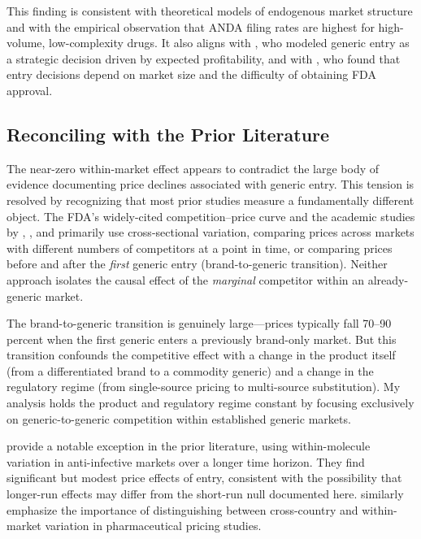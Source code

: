 \documentclass[12pt]{article}
\begin{document}
This finding is consistent with theoretical models of endogenous market structure \citep{Berry1992, Bresnahan1991, Sutton1991} and with the empirical observation that ANDA filing rates are highest for high-volume, low-complexity drugs. It also aligns with \citet{Reiffen2004}, who modeled generic entry as a strategic decision driven by expected profitability, and with \citet{Scott2005}, who found that entry decisions depend on market size and the difficulty of obtaining FDA approval.

\subsection{Reconciling with the Prior Literature}

The near-zero within-market effect appears to contradict the large body of evidence documenting price declines associated with generic entry. This tension is resolved by recognizing that most prior studies measure a fundamentally different object. The FDA's widely-cited competition--price curve \citep{FDA2019} and the academic studies by \citet{Caves1991}, \citet{Reiffen2002}, and \citet{Grabowski2007} primarily use cross-sectional variation, comparing prices across markets with different numbers of competitors at a point in time, or comparing prices before and after the \emph{first} generic entry (brand-to-generic transition). Neither approach isolates the causal effect of the \emph{marginal} competitor within an already-generic market.

The brand-to-generic transition is genuinely large---prices typically fall 70--90 percent when the first generic enters a previously brand-only market. But this transition confounds the competitive effect with a change in the product itself (from a differentiated brand to a commodity generic) and a change in the regulatory regime (from single-source pricing to multi-source substitution). My analysis holds the product and regulatory regime constant by focusing exclusively on generic-to-generic competition within established generic markets.

\citet{Wiggins2004} provide a notable exception in the prior literature, using within-molecule variation in anti-infective markets over a longer time horizon. They find significant but modest price effects of entry, consistent with the possibility that longer-run effects may differ from the short-run null documented here. \citet{Danzon2000} similarly emphasize the importance of distinguishing between cross-country and within-market variation in pharmaceutical pricing studies.
\end{document}
